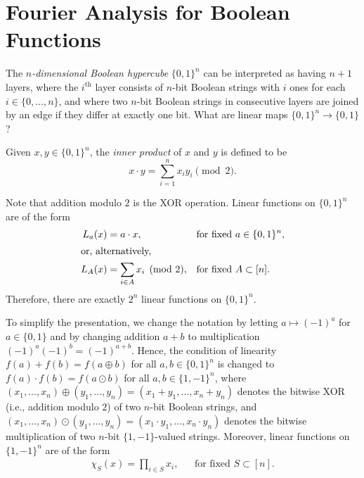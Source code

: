 \documentclass[letterpaper, reqno,11pt]{article}
\begin{document}
\section{Fourier Analysis for Boolean Functions}

The \emph{$n$-dimensional Boolean hypercube} $\{ 0, 1 \}^n$ can be interpreted as having $n + 1$ layers, where the $i^\text{th}$ layer consists of $n$-bit Boolean strings with $i$ ones for each $i \in \{ 0, \ldots, n \}$, and where two $n$-bit Boolean strings in consecutive layers are joined by an edge if they differ at exactly one bit. What are linear maps $\{ 0, 1 \}^n \to \{ 0, 1 \}$?

\begin{definition}
  Given $x, y \in \{ 0, 1 \}^n$, the \emph{inner product} of $x$ and $y$ is defined to be
  $$ x \cdot y = \sum_{i = 1}^n x_i y_i \pmod{2}. $$
\end{definition}

Note that addition modulo $2$ is the XOR operation. Linear functions on $\{ 0, 1 \}^n$ are of the form
\begin{align*}
  L_a(x) &= a \cdot x, && \text{for fixed $a \in \{ 0, 1 \}^n$}, \\
  \intertext{or, alternatively,}
  L_A(x) &= \sum_{i \in A} x_i \pmod{2}, && \text{for fixed $A \subset [n]$}.
\end{align*}
Therefore, there are exactly $2^n$ linear functions on $\{ 0, 1 \}^n$.

To simplify the presentation, we change the notation by letting $a \mapsto (-1)^a$ for $a \in \{ 0, 1 \}$ and by changing addition $a + b$ to multiplication $(-1)^a (-1)^b = (-1)^{a + b}$. Hence, the condition of linearity $f(a) + f(b) = f(a \oplus b)$ for all $a, b \in \{ 0, 1 \}^n$ is changed to $f(a) \cdot f(b) = f(a \odot b)$ for all $a, b \in \{ 1, -1 \}^n$, where $(x_1, \ldots, x_n) \oplus (y_1, \ldots, y_n) = (x_1 + y_1, \ldots, x_n + y_n)$ denotes the bitwise XOR (i.e., addition modulo $2$) of two $n$-bit Boolean strings, and $(x_1, \ldots, x_n) \odot (y_1, \ldots, y_n) = (x_1 \cdot y_1, \ldots, x_n \cdot y_n)$ denotes the bitwise multiplication of two $n$-bit $\{ 1, -1 \}$-valued strings. Moreover, linear functions on $\{ 1, -1 \}^n$ are of the form
\begin{align*}
  \chi_S(x) = \prod_{i \in S} x_i, && \text{for fixed $S \subset [n]$}.
\end{align*}
\end{document}
